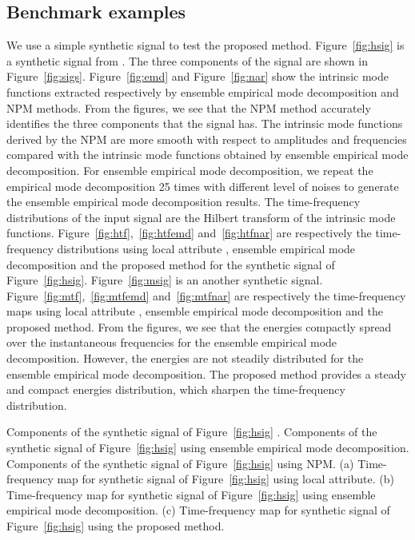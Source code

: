 \subsection{Benchmark examples}
We use a simple synthetic signal to test the proposed method. 
Figure~\ref{fig:hsig} is a synthetic signal from \citet[]{hou}. 
The three components of the signal are shown in Figure~\ref{fig:sigs}. 
Figure~\ref{fig:emd} and Figure~\ref{fig:nar} show the intrinsic mode functions 
extracted respectively by ensemble empirical mode decomposition and NPM methods. 
From the figures, we see that the NPM method 
accurately identifies the three components that the signal has. 
The intrinsic mode functions derived by the NPM are 
more smooth with respect to amplitudes and frequencies 
compared with the intrinsic mode functions obtained by ensemble empirical mode decomposition. 
For ensemble empirical mode decomposition, we repeat the empirical mode decomposition 25 times with different level of noises 
to generate the ensemble empirical mode decomposition results.
The time-frequency distributions of the input signal are the 
Hilbert transform of the intrinsic mode functions. 
Figure~\ref{fig:htf},~\ref{fig:htfemd} and~\ref{fig:htfnar} 
are respectively the time-frequency distributions using local attribute \cite[]{guochang2011}, 
ensemble empirical mode decomposition \cite[]{eemd} and the proposed method for the synthetic 
signal of Figure~\ref{fig:hsig}. 
Figure~\ref{fig:msig} is an another synthetic signal. 
Figure~\ref{fig:mtf},~\ref{fig:mtfemd} and~\ref{fig:mtfnar}
are respectively the time-frequency maps using local attribute 
\cite[]{guochang2011}, ensemble empirical mode decomposition \cite[]{eemd} and the proposed method. 
From the figures, we see that the energies compactly spread over the instantaneous 
frequencies for the ensemble empirical mode decomposition. 
However, the energies are not steadily distributed for the ensemble empirical mode decomposition. 
The proposed method provides a steady and compact energies distribution, which 
sharpen the time-frequency distribution.

 {Components of the synthetic 
signal of Figure~\ref{fig:hsig} .}
 {Components of the synthetic 
signal of Figure~\ref{fig:hsig} using ensemble empirical mode decomposition.}
 {Components of the synthetic 
signal of Figure~\ref{fig:hsig} using NPM.}
  {(a) Time-frequency map for synthetic signal of Figure~\ref{fig:hsig} using local attribute. 
  (b) Time-frequency map for synthetic signal of Figure~\ref{fig:hsig} using ensemble empirical mode decomposition. 
  (c) Time-frequency map  for synthetic signal of Figure~\ref{fig:hsig} using the proposed method.}

